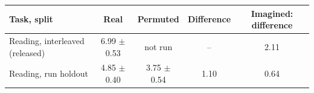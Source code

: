 \begin{tabular}{lcccc}
\toprule
Task, split & Real & Permuted & Difference & Imagined: difference \\
\midrule
Reading, interleaved (released) & 6.99 $\pm$ 0.53 & not run & -- & 2.11 \\
Reading, run holdout & 4.85 $\pm$ 0.40 & 3.75 $\pm$ 0.54 & 1.10 & 0.64 \\
\bottomrule
\end{tabular}
